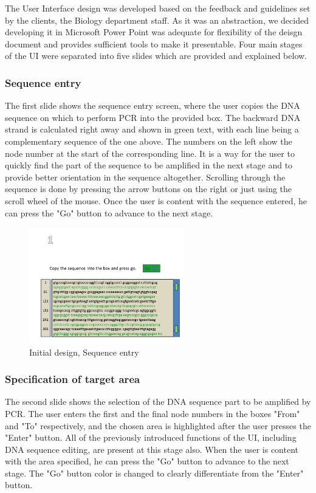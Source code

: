 The User Interface design was developed based on the feedback and guidelines set by the clients, the Biology department staff. As it was an abstraction, we decided developing it in Microsoft Power Point was adequate for flexibility of the deisgn document and provides sufficient tools to make it presentable. Four main stages of the UI were separated into five slides which are provided and explained below.


\subsubsection{Sequence entry}
The first slide shows the sequence entry screen, where the user copies the DNA sequence on which to perform PCR into the provided box. The backward DNA strand is calculated right away and shown in green text, with each line being a complementary sequence of the one above. The numbers on the left show the node number at the start of the corresponding line. It is a way for the user to quickly find the part of the sequence to be amplified in the next stage and to provide better orientation in the sequence altogether. Scrolling through the sequence is done by pressing the arrow buttons on the right or just using the scroll wheel of the mouse. Once the user is content with the sequence entered, he can press the "Go" button to advance to the next stage.

\begin{figure}[h]
  \begin{center}
	\includegraphics[width=0.6\textwidth]{./images/UiDes/Slide1.JPG}
    \caption{
      \label{fig:UiDes:slide1}
      Initial design, Sequence entry
    }
  \end{center}
\end{figure}

\subsubsection{Specification of target area}
The second slide shows the selection of the DNA sequence part to be amplified by PCR. The user enters the first and the final node numbers in the boxes "From" and "To" respectively, and the chosen area is highlighted after the user presses the "Enter" button. All of the previously introduced functions of the UI, including DNA sequence editing, are present at this stage also. When the user is content with the area specified, he can press the "Go" button to advance to the next stage. The "Go" button color is changed to clearly differentiate from the "Enter" button.

